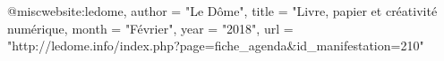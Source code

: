 @misc{website:ledome,
		author = "Le Dôme",
		title = "Livre, papier et créativité numérique,
		month = "Février",
		year = "2018",
		url = "http://ledome.info/index.php?page=fiche_agenda&id_manifestation=210"
	}

